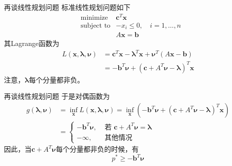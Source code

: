 
\begin{frame}

\begin{block}{再谈线性规划问题}
标准线性规划问题如下
\begin{eqnarray*}
& \text{minimize} & \mathbf{c}^T\mathbf{x} \\
& \text{subject to} & -x_i \le 0, \quad i = 1,\ldots,n \\
& & A\mathbf{x} = \mathbf{b}
\end{eqnarray*}
其Lagrange函数为
\begin{align*}
L(\mathbf{x}, \boldsymbol\lambda, \boldsymbol\nu) & = \mathbf{c}^T\mathbf{x} - \boldsymbol\lambda^T \mathbf{x} + \boldsymbol\nu^T(A\mathbf{x} - \mathbf{b}) \\
& = -\mathbf{b}^T \boldsymbol\nu + (\mathbf{c} + A^T \boldsymbol\nu - \boldsymbol\lambda)^T \mathbf{x}
\end{align*}
注意，$\boldsymbol\lambda$每个分量都非负。
\end{block}

\end{frame}


\begin{frame}

\begin{block}{再谈线性规划问题}
于是对偶函数为
\begin{align*}
g(\boldsymbol\lambda, \boldsymbol\nu) & = \inf\limits_{\mathbf{x}} L(\mathbf{x}, \boldsymbol\lambda, \boldsymbol\nu) = \inf\limits_{\mathbf{x}} (-\mathbf{b}^T \boldsymbol\nu + (\mathbf{c} + A^T \boldsymbol\nu - \boldsymbol\lambda)^T \mathbf{x}) \\
& = \begin{cases}
-\mathbf{b}^T \boldsymbol\nu, & \text{ 若 } \mathbf{c} + A^T \boldsymbol\nu = \boldsymbol\lambda \\
-\infty, & \text{ 其他情况 }
\end{cases}
\end{align*}
因此，当$\mathbf{c} + A^T \boldsymbol\nu$每个分量都非负的时候，有
\[p^* \ge -\mathbf{b}^T \boldsymbol\nu\]
\end{block}

\end{frame}


